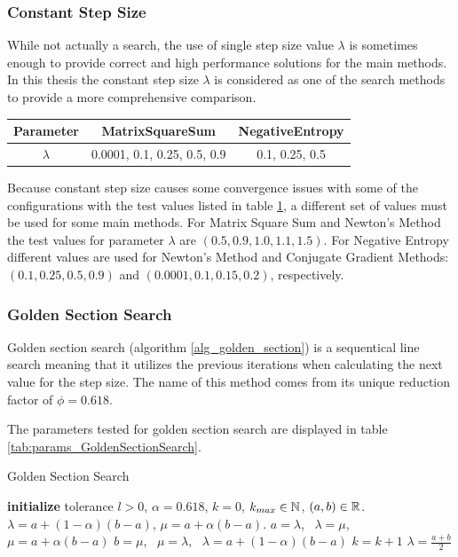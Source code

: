 \documentclass[a4paper,english,titlepage,12pt]{article}
\newcommand{\R}{\ensuremath\mathbb{R}}
\newcommand{\N}{\ensuremath\mathbb{N}}
\begin{document}
\subsubsection{Constant Step Size}


While not actually a search, the use of single step size value $\lambda$ is sometimes enough to provide correct and high performance solutions for the main methods. In this thesis the constant step size $\lambda$ is considered as one of the search methods to provide a more comprehensive comparison.

\begin{table}[H]
\label{tab:params_ConstantSearch}
\centering
{}
\begin{tabular}{|c|c|c|}
\hline
\rowcolor{gray!25}
Parameter & MatrixSquareSum & NegativeEntropy \\
\hline
$\lambda$ & 0.0001, 0.1, 0.25, 0.5, 0.9 & 0.1, 0.25, 0.5 \\
\hline
\end{tabular}
\end{table}

Because constant step size causes some convergence issues with some of the configurations with the test values listed in table \ref{tab:params_ConstantSearch}, a different set of values must be used for some main methods. For Matrix Square Sum and Newton's Method the test values for parameter $\lambda$ are $(0.5, 0.9, 1.0, 1.1, 1.5)$. For Negative Entropy different values are used for Newton's Method and Conjugate Gradient Methods: $(0.1, 0.25, 0.5, 0.9)$ and $(0.0001, 0.1, 0.15, 0.2)$, respectively.


\subsubsection{Golden Section Search}
\label{sect:golden_section_search}

Golden section search (algorithm \ref{alg_golden_section}) is a sequentical line search meaning that it utilizes the previous iterations when calculating the next value for the step size. The name of this method comes from its unique reduction factor of $\phi = 0.618$. \cite{book:nonlinear_programming}

The parameters tested for golden section search are displayed in table \ref{tab:params_GoldenSectionSearch}.

\begin{algorithm}[H]
\caption{Golden Section Search}
\label{alg_golden_section}
\begin{algorithmic}[1]
\STATE \textbf{initialize} tolerance $l > 0$, $\alpha = 0.618$, $k = 0$, $k_{max} \in \N$, $(a, b) \in \R$.
\STATE $\lambda = a + (1 - \alpha) (b - a)$, $\mu = a + \alpha (b - a)$.
    \IF{$\theta(\lambda) > \theta(\mu)$}
        \STATE $a = \lambda$, \ $\lambda = \mu$, \ $\mu = a + \alpha (b - a)$
    \ELSE
        \STATE $b = \mu$, \ $\mu = \lambda$, \ $\lambda = a + (1 - \alpha) (b - a)$
    \ENDIF
    \STATE $k = k + 1$
\ENDWHILE
\RETURN $\lambda = \frac{a + b}{2}$
\end{algorithmic}
\end{algorithm}
\end{document}
